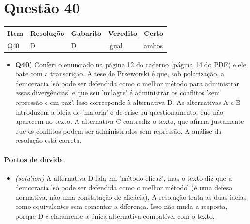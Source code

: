 \documentclass{article}%
\begin{document}
\section*{Questão 40}%
\begin{longtable}{@{}p{} p{} p{} p{} p{}@{}}\toprule Item & Resolução & Gabarito & Veredito & Certo \\ \midrule
Q40 & D & D & igual & ambos \\
\bottomrule\end{longtable}%
\begin{itemize}%
\item%
\textbf{Q40)} Conferi o enunciado na página 12 do caderno (página 14 do PDF) e ele bate com a transcrição. A tese de Przeworski é que, sob polarização, a democracia 'só pode ser defendida como o melhor método para administrar essas divergências' e que seu 'milagre' é administrar os conflitos 'sem repressão e em paz'. Isso corresponde à alternativa D. As alternativas A e B introduzem a ideia de 'maioria' e de crise ou questionamento, que não aparecem no texto. A alternativa C contradiz o texto, que afirma justamente que os conflitos podem ser administrados sem repressão. A análise da resolução está correta.%
\end{itemize}%
\paragraph{Pontos de dúvida}%
\begin{itemize}%
\item%
\textit{(solution)} A alternativa D fala em 'método eficaz', mas o texto diz que a democracia 'só pode ser defendida como o melhor método' (é uma defesa normativa, não uma constatação de eficácia). A resolução trata as duas ideias como equivalentes sem comentar a diferença. Isso não muda a resposta, porque D é claramente a única alternativa compatível com o texto.%
\end{itemize}%
\end{document}
